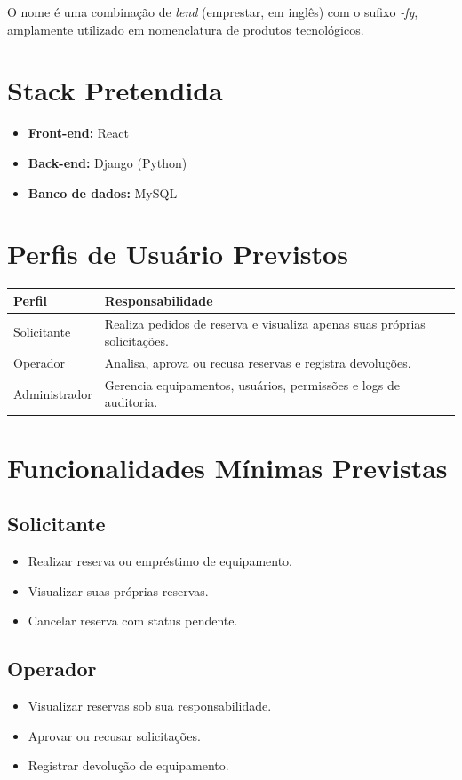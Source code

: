\documentclass[12pt,a4paper]{article}
\begin{document}
O nome é uma combinação de \textit{lend} (emprestar, em inglês) com o sufixo
\textit{-fy}, amplamente utilizado em nomenclatura de produtos tecnológicos.

\section*{Stack Pretendida}

\begin{itemize}
    \item \textbf{Front-end:} React
    \item \textbf{Back-end:} Django (Python)
    \item \textbf{Banco de dados:} MySQL
\end{itemize}

\section*{Perfis de Usuário Previstos}

\begin{tabular}{@{}p{3.5cm}p{10cm}@{}}
\toprule
\textbf{Perfil} & \textbf{Responsabilidade} \\
\midrule
Solicitante   & Realiza pedidos de reserva e visualiza apenas suas próprias solicitações. \\
Operador      & Analisa, aprova ou recusa reservas e registra devoluções. \\
Administrador & Gerencia equipamentos, usuários, permissões e logs de auditoria. \\
\bottomrule
\end{tabular}

\section*{Funcionalidades Mínimas Previstas}

\subsection*{Solicitante}
\begin{itemize}
    \item Realizar reserva ou empréstimo de equipamento.
    \item Visualizar suas próprias reservas.
    \item Cancelar reserva com status pendente.
\end{itemize}

\subsection*{Operador}
\begin{itemize}
    \item Visualizar reservas sob sua responsabilidade.
    \item Aprovar ou recusar solicitações.
    \item Registrar devolução de equipamento.
\end{itemize}
\end{document}
